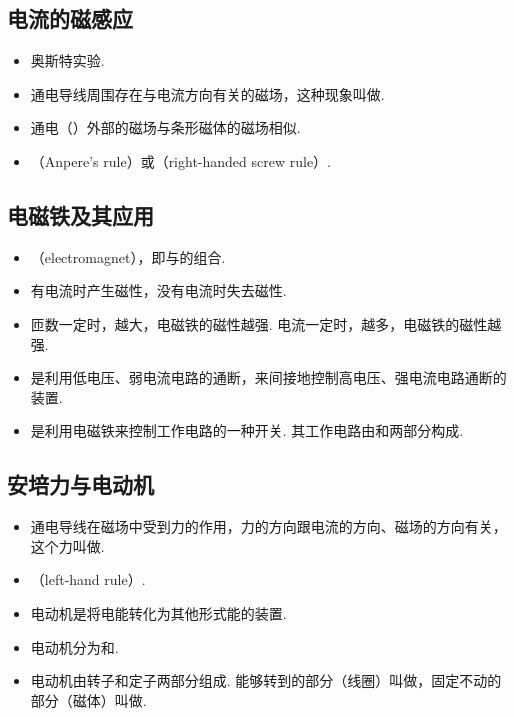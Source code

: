 \subsection{电流的磁感应}
\begin{itemize}
\item 奥斯特实验.
\item 通电导线周围存在与电流方向有关的磁场，这种现象叫做.
\item 通电（）外部的磁场与条形磁体的磁场相似.
\item {}（Anpere's rule）或（right-handed screw rule）.
\end{itemize}

\subsection{电磁铁及其应用}
\begin{itemize}
\item {}（electromagnet），即与的组合.
\item 有电流时产生磁性，没有电流时失去磁性.
\item 匝数一定时，越大，电磁铁的磁性越强. 电流一定时，越多，电磁铁的磁性越强.
\item {}是利用低电压、弱电流电路的通断，来间接地控制高电压、强电流电路通断的装置.
\item {}是利用电磁铁来控制工作电路的一种开关. 其工作电路由和两部分构成.
\end{itemize}

\subsection{安培力与电动机}
\begin{itemize}
\item 通电导线在磁场中受到力的作用，力的方向跟电流的方向、磁场的方向有关，这个力叫做.
\item {}（left-hand rule）.
\item 电动机是将电能转化为其他形式能的装置.
\item 电动机分为和.
\item 电动机由转子和定子两部分组成. 能够转到的部分（线圈）叫做，固定不动的部分（磁体）叫做.
\end{itemize}


